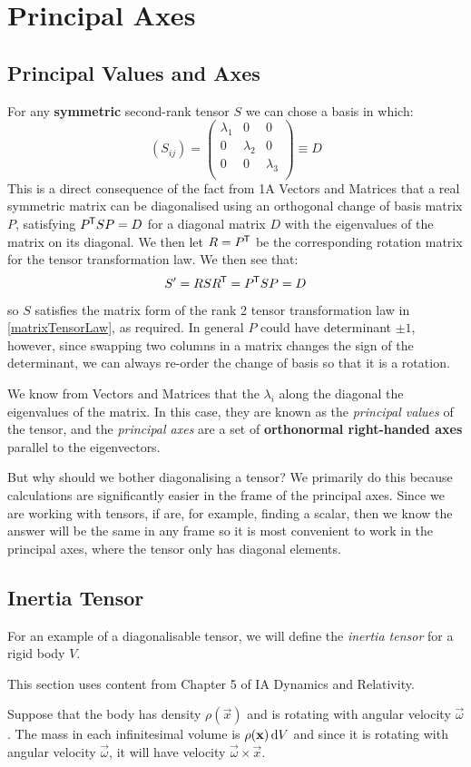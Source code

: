 \documentclass[../main.tex]{subfiles}
\begin{document}
\section{Principal Axes}
\subsection{Principal Values and Axes}
For any \textbf{symmetric} second-rank tensor $S$ we can chose a basis in which:
\[
  (S_{i j}) = \begin{pmatrix}
  \lambda_1 & 0 & 0 \\
  0 & \lambda_2 & 0 \\
  0 & 0 & \lambda_3 \\
  \end{pmatrix} \equiv D
\]
This is a direct consequence of the fact from 1A Vectors and Matrices that a real symmetric matrix can be diagonalised using an orthogonal change of basis matrix $P$, satisfying $P^{{\mkern-1.5mu\mathsf{T}}} S P = D$ for a diagonal matrix $D$ with the eigenvalues of the matrix on its diagonal.
We then let $R = P^{{\mkern-1.5mu\mathsf{T}}}$ be the corresponding rotation matrix for the tensor transformation law.
We then see that:
\[
  S' = RSR^{{\mkern-1.5mu\mathsf{T}}} = P^{{\mkern-1.5mu\mathsf{T}}}SP = D
\]
so $S$ satisfies the matrix form of the rank 2 tensor transformation law in \cref{matrixTensorLaw}, as required.
In general $P$ could have determinant $\pm 1$, however, since swapping two columns in a matrix changes the sign of the determinant, we can always re-order the change of basis so that it is a rotation.

We know from Vectors and Matrices that the $\lambda_i$ along the diagonal the eigenvalues of the matrix.
In this case, they are known as the \textit{principal values} of the tensor, and the \textit{principal axes} are a set of \textbf{orthonormal right-handed axes} parallel to the eigenvectors.

But why should we bother diagonalising a tensor?
We primarily do this because calculations are significantly easier in the frame of the principal axes.
Since we are working with tensors, if are, for example, finding a scalar, then we know the answer will be the same in any frame so it is most convenient to work in the principal axes, where the tensor only has diagonal elements.
\subsection{Inertia Tensor}
For an example of a diagonalisable tensor, we will define the \textit{inertia tensor} for a rigid body $V$.
\begin{remark}[Recap]
  This section uses content from Chapter 5 of IA Dynamics and Relativity.
\end{remark}
Suppose that the body has density $\rho(\vec{x})$ and is rotating with angular velocity $\vec{\omega}$.
The mass in each infinitesimal volume is $\rho(\vec{x})\d{V}$ and since it is rotating with angular velocity $\vec{\omega}$, it will have velocity $\vec{\omega} \times \vec{x}$.
\end{document}
